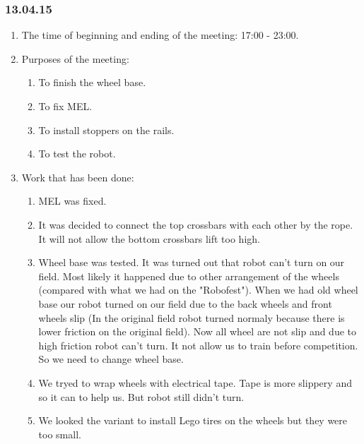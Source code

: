 \subsubsection{13.04.15}
\begin{enumerate}
	
	\item The time of beginning and ending of the meeting: 17:00 - 23:00.
	
	\item Purposes of the meeting: 
	\begin{enumerate}
		
		\item To finish the wheel base.
		
		\item To fix MEL.
		
		\item To install stoppers on the rails.
		
		\item To test the robot.
		
	\end{enumerate}
	
	\item Work that has been done:
	\begin{enumerate}
				
		\item MEL was fixed.
		
		\item It was decided to connect the top crossbars with each other by the rope. It will not allow the bottom crossbars lift too high.
		
		\item Wheel base was tested. It was turned out that robot can't turn on our field. Most likely it happened due to other arrangement of the wheels (compared with what we had on the "Robofest"). When we had old wheel base our robot turned on our field due to the back wheels and front wheels slip (In the original field robot turned normaly because there is lower friction on the original field). Now all wheel are not slip and due to high friction robot can't turn. It not allow us to train before competition. So we need to change wheel base.
		
		\item We tryed to wrap wheels with electrical tape. Tape is more slippery and so it can to help us. But robot still didn't turn.
		
		\item We looked the variant to install Lego tires on the wheels but they were too small.
		

\end{enumerate}
\end{enumerate}
